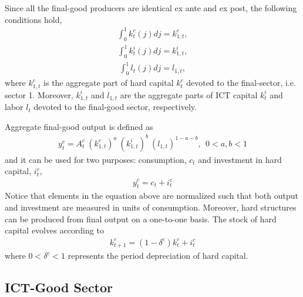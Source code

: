 \documentclass[12pt]{article}
\begin{document}
Since all the final-good producers are identical ex ante and ex post, the following conditions hold,
\begin{eqnarray}\label{equation:aggregation_hard_final}
\int_0^1 k^c_{t}(j) dj = k^c_{1,t},
\end{eqnarray}
\begin{eqnarray}\label{equation:aggregation_ICT_final}
\int_0^1 k^i_{t}(j) dj = k^i_{1,t}, 
\end{eqnarray}
\begin{eqnarray}\label{equation:aggregation_labor_final}
\int_0^1 l_{t}(j) dj = l_{1,t},
\end{eqnarray}
where $k^c_{1,t}$ is the aggregate part of hard capital $k^c_t$ devoted to the final-sector, i.e. sector 1. Moreover, $k^i_{1,t}$ and $l_{1,t}$ are the aggregate parts of ICT capital $k^i_{t}$ and labor $l_{t}$ devoted to the final-good sector, respectively. 


Aggregate final-good output is defined as
\begin{eqnarray}\label{equation:production_FINAL_aggregate}
y^c_t = A^c_t \ ( k^c_{1,t} )^a \ ( k^i_{1,t} )^b \ ( l_{1,t} )^{1-a-b}, \ \ 0 < a,b < 1
\end{eqnarray}
and it can be used for two purposes: consumption, $c_t$ and investment in hard capital, $i^c_t$,
\begin{eqnarray}\label{equation:resourceFINAL}
y^c_t = c_t + i^c_t
\end{eqnarray}
Notice that elements in the equation above are normalized such that both output and investment are measured in units of consumption. Moreover, hard structures can be produced from final output on a one-to-one basis. The stock of hard capital evolves according to
\begin{eqnarray}\label{equation:LOM_Hard}
k^c_{t+1} = (1 - \delta^c) k^c_t + i^c_t
\end{eqnarray}
where $0 < \delta^c < 1$ represents the period depreciation of hard capital.

\subsection{ICT-Good Sector}
\end{document}
